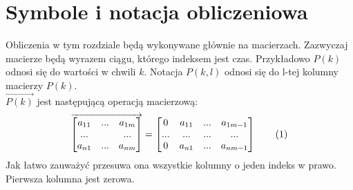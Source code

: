 \documentclass[12pt]{book}
\newcommand\addtag{\refstepcounter{equation}
\renewcommand{\labelenumii}{\theenumii}
\renewcommand{\theenumii}{\theenumi.\arabic{enumii}.}
\tag{\theequation}}
\begin{document}
\section{Symbole i notacja obliczeniowa}
Obliczenia w tym rozdziale będą wykonywane głównie na macierzach. Zazwyczaj macierze będą wyrazem ciągu, którego indeksem jest czas. Przykładowo $P(k)$ odnosi się do wartości w chwili $k$. Notacja $P(k,l)$ odnosi się do l-tej kolumny macierzy $P(k)$.\\
$\overrightarrow{P(k)}$ jest następującą operacją macierzową:
\begin{gather}
\overrightarrow{
  \begin{bmatrix}
   a_{11} & ... & a_{1m}\\
   ... & & ...\\
   a_{n1} & ... & a_{nm}\\
   \end{bmatrix}}
 =
  \begin{bmatrix}
   0 & a_{11} & ... & a_{1m-1}\\
   ... & ... & ... & ...\\
   0 & a_{n1} & ... & a_{nm-1}\\
   \end{bmatrix}
   \addtag
   \label{arrow_function}
\end{gather}
Jak łatwo zauważyć przesuwa ona wszystkie kolumny o jeden indeks w prawo. Pierwsza kolumna jest zerowa.
\end{document}
